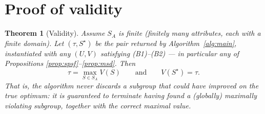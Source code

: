 \documentclass[11pt]{article}
\newtheorem{theorem}{Theorem}
\begin{document}
\section{Proof of validity}

\begin{theorem}[Validity]\label{thm:main}
Assume $S_A$ is finite (finitely many attributes, each with a finite domain). Let
$(\tau,S^\star)$ be the pair returned by Algorithm~\ref{alg:main}, instantiated with any
$(U,V)$ satisfying (B1)--(B2) — in particular any of Propositions
\ref{prop:spsf}--\ref{prop:msd}. Then
\[
\tau=\max_{S\in S_A}V(S) \qquad\text{and}\qquad V(S^\star)=\tau.
\]
That is, the algorithm never discards a subgroup that could have improved on the true
optimum: it is guaranteed to terminate having found a (globally) maximally violating
subgroup, together with the correct maximal value.
\end{theorem}
\end{document}
